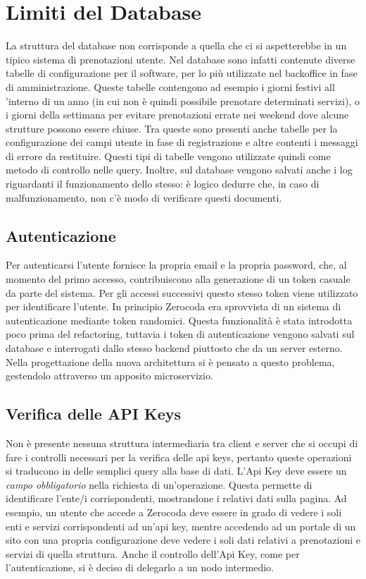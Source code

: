 \section{Limiti del Database}
La struttura del database non corrisponde a quella che ci si aspetterebbe in un tipico sistema di prenotazioni utente. Nel database sono infatti contenute diverse tabelle di configurazione per il software, per lo più utilizzate nel backoffice in fase di amministrazione. Queste tabelle contengono ad esempio i giorni festivi all 'interno di un anno (in cui non è quindi possibile prenotare determinati servizi), o i giorni della settimana per evitare prenotazioni errate nei weekend dove alcune strutture possono essere chiuse. Tra queste sono presenti anche tabelle per la configurazione dei campi utente in fase di registrazione e altre contenti i messaggi di errore da restituire. Questi tipi di tabelle vengono utilizzate quindi come metodo di controllo nelle query. Inoltre, sul database vengono salvati anche i log riguardanti il funzionamento dello stesso: è logico dedurre che, in caso di malfunzionamento, non c'è modo di verificare questi documenti.

\subsection{Autenticazione}
 Per autenticarsi l'utente fornisce la propria email e la propria password, che, al momento del primo accesso, contribuiscono alla generazione di un token casuale da parte del sistema. Per gli accessi successivi questo stesso token viene utilizzato per identificare l'utente. In principio Zerocoda era sprovvista di un sistema di autenticazione mediante token randomici. Questa funzionalità è stata introdotta poco prima del refactoring, tuttavia i token di autenticazione vengono salvati sul database e interrogati dallo stesso backend piuttosto che da un server esterno. Nella progettazione della nuova architettura si è pensato a questo problema, gestendolo attraverso un apposito microservizio.

\subsection{Verifica delle API Keys}
Non è presente nessuna struttura intermediaria tra client e server che si occupi di fare i controlli necessari per la verifica delle api keys, pertanto queste operazioni si traducono in delle semplici query alla base di dati. L'Api Key deve essere un \emph{campo obbligatorio} nella richiesta di un'operazione. Questa permette di identificare l'ente/i corrispondenti, mostrandone i relativi dati sulla pagina. Ad esempio, un utente che accede a Zerocoda deve essere in grado di vedere i soli enti e servizi corrispondenti ad un'api key, mentre accedendo ad un portale di un sito con una propria configurazione deve vedere i soli dati relativi a prenotazioni e servizi di quella struttura. Anche il controllo dell'Api Key, come per l'autenticazione, si è deciso di delegarlo a un nodo intermedio.

